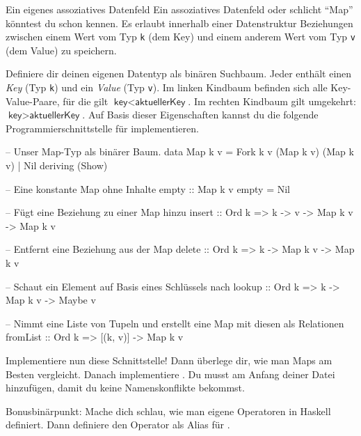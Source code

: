 \documentclass{uebblatt}
\begin{document}
\begin{aufgabe}{Ein eigenes assoziatives Datenfeld}
Ein assoziatives Datenfeld oder schlicht "`Map"' könntest du schon kennen. Es erlaubt innerhalb einer Datenstruktur Beziehungen zwischen einem Wert vom Typ \verb|k| (dem Key) und einem anderem Wert vom Typ \verb|v| (dem Value) zu speichern.

Definiere dir deinen eigenen Datentyp  als binären Suchbaum. Jeder  enthält einen \emph{Key} (Typ \verb|k|) und ein \emph{Value} (Typ \verb|v|). Im linken Kindbaum befinden sich alle Key-Value-Paare, für die gilt $\textsf{key} < \textsf{aktuellerKey}$. Im rechten Kindbaum gilt umgekehrt: $\textsf{key} > \textsf{aktuellerKey}$. Auf Basis dieser Eigenschaften kannst du die folgende Programmierschnittstelle für  implementieren.

\begin{haskellcode}
-- Unser Map-Typ als binärer Baum.
data Map k v = Fork k v (Map k v) (Map k v)
             | Nil deriving (Show)

-- Eine konstante Map ohne Inhalte
empty :: Map k v
empty = Nil

-- Fügt eine Beziehung zu einer Map hinzu
insert :: Ord k => k -> v -> Map k v -> Map k v

-- Entfernt eine Beziehung aus der Map
delete :: Ord k => k -> Map k v -> Map k v

-- Schaut ein Element auf Basis eines Schlüssels nach
lookup :: Ord k => k -> Map k v -> Maybe v

-- Nimmt eine Liste von Tupeln und erstellt eine Map mit diesen als Relationen
fromList :: Ord k => [(k, v)] -> Map k v
\end{haskellcode}

Implementiere nun diese Schnittstelle! Dann überlege dir, wie man Maps am Besten vergleicht. Danach implementiere . Du musst  am Anfang deiner Datei hinzufügen, damit du keine Namenskonflikte bekommst.

Bonusbinärpunkt: Mache dich schlau, wie man eigene Operatoren in Haskell definiert. Dann definiere den Operator \haskellinline{!} als Alias für .
\end{aufgabe}
\end{document}

